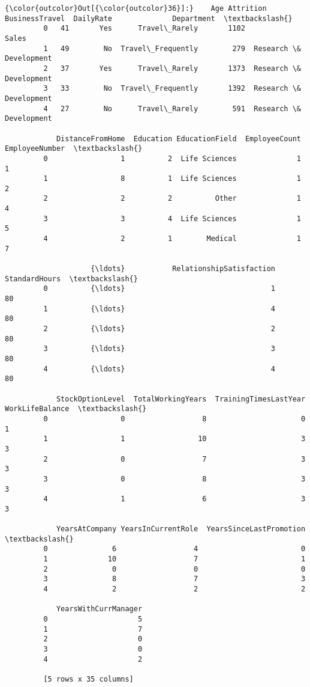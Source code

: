 \documentclass[11pt]{article}
\begin{document}
\begin{Verbatim}[commandchars=\\\{\}]
{\color{outcolor}Out[{\color{outcolor}36}]:}    Age Attrition     BusinessTravel  DailyRate              Department  \textbackslash{}
         0   41       Yes      Travel\_Rarely       1102                   Sales   
         1   49        No  Travel\_Frequently        279  Research \& Development   
         2   37       Yes      Travel\_Rarely       1373  Research \& Development   
         3   33        No  Travel\_Frequently       1392  Research \& Development   
         4   27        No      Travel\_Rarely        591  Research \& Development   
         
            DistanceFromHome  Education EducationField  EmployeeCount  EmployeeNumber  \textbackslash{}
         0                 1          2  Life Sciences              1               1   
         1                 8          1  Life Sciences              1               2   
         2                 2          2          Other              1               4   
         3                 3          4  Life Sciences              1               5   
         4                 2          1        Medical              1               7   
         
                    {\ldots}           RelationshipSatisfaction StandardHours  \textbackslash{}
         0          {\ldots}                                  1            80   
         1          {\ldots}                                  4            80   
         2          {\ldots}                                  2            80   
         3          {\ldots}                                  3            80   
         4          {\ldots}                                  4            80   
         
            StockOptionLevel  TotalWorkingYears  TrainingTimesLastYear WorkLifeBalance  \textbackslash{}
         0                 0                  8                      0               1   
         1                 1                 10                      3               3   
         2                 0                  7                      3               3   
         3                 0                  8                      3               3   
         4                 1                  6                      3               3   
         
            YearsAtCompany YearsInCurrentRole  YearsSinceLastPromotion  \textbackslash{}
         0               6                  4                        0   
         1              10                  7                        1   
         2               0                  0                        0   
         3               8                  7                        3   
         4               2                  2                        2   
         
            YearsWithCurrManager  
         0                     5  
         1                     7  
         2                     0  
         3                     0  
         4                     2  
         
         [5 rows x 35 columns]
\end{Verbatim}
            
\end{document}
